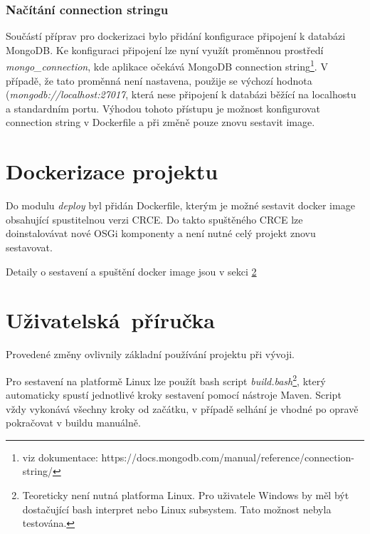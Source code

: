 \documentclass[12pt, a4paper]{article}
\begin{document}
\subsubsection{Načítání connection stringu}

Součástí příprav pro dockerizaci bylo přidání konfigurace připojení k databázi MongoDB. Ke konfiguraci připojení lze nyní využít proměnnou prostředí \textit{mongo\_connection}, kde aplikace očekává MongoDB connection string\footnote{viz dokumentace: https://docs.mongodb.com/manual/reference/connection-string/}. V případě, že tato proměnná není nastavena, použije se výchozí hodnota (\textit{mongodb://localhost:27017}, která nese připojení k databázi běžící na localhostu a standardním portu. Výhodou tohoto přístupu je možnost konfigurovat connection string v Dockerfile a při změně pouze znovu sestavit image.


\section{Dockerizace projektu}
Do modulu \textit{deploy} byl přidán Dockerfile, kterým je možné sestavit docker image obsahující spustitelnou verzi CRCE. Do takto spuštěného CRCE lze doinstalovávat nové OSGi komponenty a není nutné celý projekt znovu sestavovat. 

Detaily o sestavení a spuštění docker image jsou v sekci \ref{sec:manual}

\section{Uživatelská~příručka}
\label{sec:manual} %

Provedené změny ovlivnily základní používání projektu při vývoji. 

Pro sestavení na platformě Linux lze použít bash script \textit{build.bash}\footnote{Teoreticky není nutná platforma Linux. Pro uživatele Windows by měl být dostačující bash interpret nebo Linux subsystem. Tato možnost nebyla testována.}, který automaticky spustí jednotlivé kroky sestavení pomocí nástroje Maven. Script vždy vykonává všechny kroky od začátku, v případě selhání je vhodné po opravě pokračovat v buildu manuálně.
\end{document}
